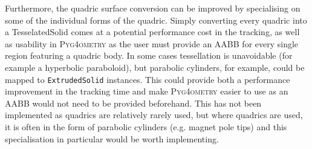 \documentclass[preprint,12pt]{elsarticle}
\newcommand{\pyinline}[1]{\lstinline[postbreak={}]{#1}}
\newcommand{\PYGEOMETRY}{\textsc{Pyg4ometry}}
\begin{document}
Furthermore, the quadric surface conversion can be improved by specialising
on some of the individual forms of the quadric.  Simply converting every
quadric into a TesselatedSolid comes at a potential performance cost in the
tracking, as well as usability in \PYGEOMETRY{} as the user must provide an
AABB for every single region featuring a quadric body.  In some cases
tessellation is unavoidable (for example a hyperbolic paraboloid), but
parabolic cylinders, for example, could be mapped to \pyinline{ExtrudedSolid}
instances.
This could provide both a performance improvement in the tracking time and
make \PYGEOMETRY{} easier to use as an AABB would not need to be provided
beforehand.  This has not been implemented as quadrics are relatively
rarely used, but where quadrics are used, it is often in the form of
parabolic cylinders (e.g. magnet pole tips) and this specialisation in
particular would be worth implementing.
\end{document}

